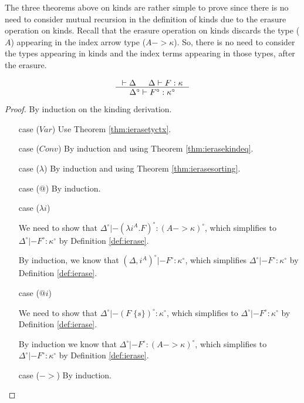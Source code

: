 The three theorems above on kinds are rather simple to prove since there is
no need to consider mutual recursion in the definition of kinds due to
the erasure operation on kinds. Recall that the erasure operation on kinds
discards the type ($A$) appearing in the index arrow type ($A -> \kappa$).
So, there is no need to consider the types appearing in kinds
and the index terms appearing in those types, after the erasure.\\

\begin{theorem}
\label{thm:ierasekinding}
\[ \inference{|- \Delta & \Delta |- F : \kappa}
		{\Delta^\circ |- F^\circ : \kappa^\circ}
\]
\end{theorem}
\begin{proof}
	By induction on the kinding derivation.
\begin{itemize}
\item[case] ($Var$)
	Use Theorem \ref{thm:ierasetyctx}.

\item[case] ($Conv$)
	By induction and using Theorem \ref{thm:ierasekindeq}.

\item[case] ($\lambda$)
	By induction and using Theorem \ref{thm:ierasesorting}.

\item[case] ($@$)
	By induction.

\item[case] ($\lambda i$)

	We need to show that
	$\Delta^\circ |- (\lambda i^A.F)^\circ : (A -> \kappa)^\circ$,
	which simplifies to $\Delta^\circ |- F^\circ : \kappa^\circ$
	by Definition \ref{def:ierase}.

	By induction, we know that
	$(\Delta,i^A)^\circ |- F^\circ : \kappa^\circ $,
	which simplifies $\Delta^\circ |- F^\circ : \kappa^\circ$
	by Definition \ref{def:ierase}.

\item[case] ($@ i$)

	We need to show that
	$\Delta^\circ |- (F\;\{s\})^\circ : \kappa^\circ$,
	which simplifies to $\Delta^\circ |- F^\circ : \kappa^\circ$
	by Definition \ref{def:ierase}.

	By induction we know that
	$\Delta^\circ |- F^\circ : (A -> \kappa)^\circ$,
	which simplifies to $\Delta^\circ |- F^\circ : \kappa^\circ$
	by Definition \ref{def:ierase}.

\item[case] ($->$)
	By induction.


\end{itemize}
\end{proof}
